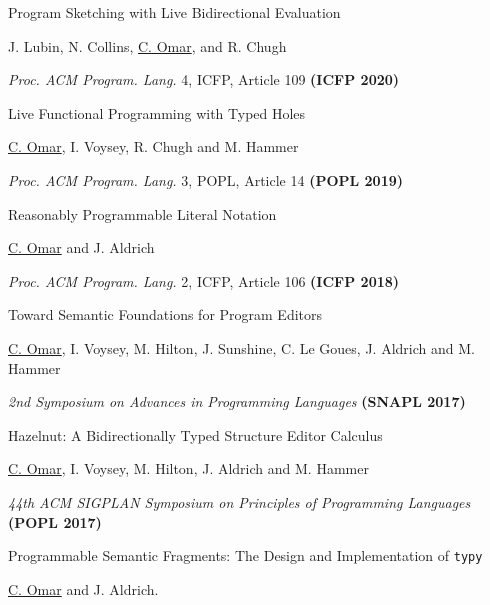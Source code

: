 \documentclass[10pt,letterpaper]{article}
\renewenvironment{itemize}{
  \begin{list}{}{
    \setlength{\leftmargin}{1.25em}
    \setlength{\itemsep}{0.25em}
    \setlength{\parskip}{0pt}
    \setlength{\parsep}{0.2em}
  }
}{
  \end{list}
}
\begin{document}
\begin{enumerate}
\item {Program Sketching with Live Bidirectional Evaluation}
  \begin{itemize}
    \item J. Lubin, N. Collins, \underline{C. Omar}, and R. Chugh
    \item \textit{Proc. ACM Program. Lang.} 4, ICFP, Article 109 \textbf{(ICFP 2020)}
  \end{itemize}
\item {Live Functional Programming with Typed Holes}
  \begin{itemize}
    \item \underline{C. Omar}, I. Voysey, R. Chugh and M. Hammer
    \item \textit{Proc. ACM Program. Lang.} 3, POPL, Article 14 \textbf{(POPL 2019)}
  \end{itemize}
\item {Reasonably Programmable Literal Notation}
  \begin{itemize}
    \item \underline{C. Omar} and J. Aldrich
    \item \textit{Proc. ACM Program. Lang.} 2, ICFP, Article 106 \textbf{(ICFP 2018)}
  \end{itemize}
\item Toward Semantic Foundations for Program Editors
  \begin{itemize}
    \item \underline{C. Omar}, I. Voysey, M. Hilton, J. Sunshine, C. Le Goues, J. Aldrich and M. Hammer
    \item \textit{2nd Symposium on Advances in Programming Languages} {\textbf{(SNAPL 2017)}}
  \end{itemize}
\item {Hazelnut: A Bidirectionally Typed Structure Editor Calculus}
  \begin{itemize}
    \item \underline{C. Omar}, I. Voysey, M. Hilton, J. Aldrich and M. Hammer
    \item \textit{44th ACM SIGPLAN Symposium on Principles of Programming Languages} {\textbf{(POPL 2017)}}
  \end{itemize}
\item {Programmable Semantic Fragments: The Design and Implementation of \texttt{typy}}
  \begin{itemize}
    \item \underline{C. Omar} and J. Aldrich.

\end{itemize}
\end{enumerate}
\end{document}
